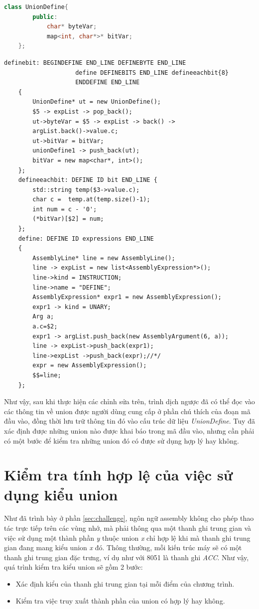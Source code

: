 \begin{changemargin}{0cm}{0cm} 
	\begin{lstlisting}[caption={Cấu trúc dữ liệu để lưu trữ một union},label={list:listuniondefine},language=c++]
	class UnionDefine{
		public:
			char* byteVar;
			map<int, char*>* bitVar;
	};
	\end{lstlisting}
	\begin{lstlisting}[caption={Đoạn mã parser bao gồm các hành động sau khi nhận biết được union},label={list:8051parser2}]
	definebit: BEGINDEFINE END_LINE DEFINEBYTE END_LINE 
					define DEFINEBITS END_LINE defineeachbit{8} 
					ENDDEFINE END_LINE
	{
		UnionDefine* ut = new UnionDefine();
		$5 -> expList -> pop_back();
		ut->byteVar = $5 -> expList -> back() -> 
		argList.back()->value.c;
		ut->bitVar = bitVar;
		unionDefine1 -> push_back(ut);
		bitVar = new map<char*, int>();
	};
	defineeachbit: DEFINE ID bit END_LINE {
		std::string temp($3->value.c);
		char c =  temp.at(temp.size()-1);
		int num = c - '0';
		(*bitVar)[$2] = num;
	};
	define: DEFINE ID expressions END_LINE 
	{ 
		AssemblyLine* line = new AssemblyLine();
		line -> expList = new list<AssemblyExpression*>();
		line->kind = INSTRUCTION;
		line->name = "DEFINE";
		AssemblyExpression* expr1 = new AssemblyExpression();
		expr1 -> kind = UNARY;
		Arg a;
		a.c=$2;
		expr1 -> argList.push_back(new AssemblyArgument(6, a));
		line -> expList->push_back(expr1);
		line->expList ->push_back(expr);//*/
		expr = new AssemblyExpression();
		$$=line;
	};
	\end{lstlisting}
\end{changemargin} 
	
Như vậy, sau khi thực hiện các chỉnh sửa trên, trình dịch ngược đã có thể đọc vào các thông tin về union được người dùng cung cấp ở phần chú thích của đoạn mã đầu vào, đồng thời lưu trữ thông tin đó vào cấu trúc dữ liệu \textit{UnionDefine}. Tuy đã xác định được những union nào được khai báo trong mã đầu vào, nhưng cần phải có một bước để kiểm tra những union đó có được sử dụng hợp lý hay không.
\section{Kiểm tra tính hợp lệ của việc sử dụng kiểu union}
Như đã trình bày ở phần \ref{sec:challenge}, ngôn ngữ assembly không cho phép thao tác trực tiếp trên các vùng nhớ, mà phải thông qua một thanh ghi trung gian và việc sử dụng một thành phần \textit{y} thuộc union \textit{x} chỉ hợp lệ khi mà thanh ghi trung gian đang mang kiểu union \textit{x} đó. Thông thường, mỗi kiến trúc máy sẽ có một thanh ghi trung gian đặc trưng, ví dụ như với 8051 là thanh ghi \textit{ACC}. Như vậy, quá trình kiểm tra kiểu union sẽ gồm 2 bước:
\begin{itemize}
	\item Xác định kiểu của thanh ghi trung gian tại mỗi điểm của chương trình.
	\item Kiểm tra việc truy xuất thành phần của union có hợp lý hay không.
\end{itemize}

